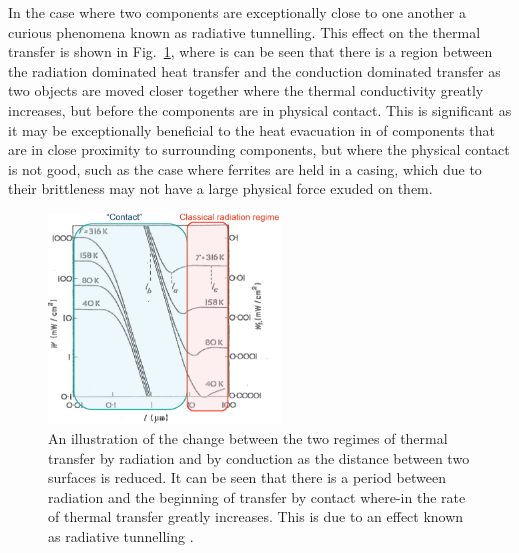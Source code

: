 In the case where two components are exceptionally close to one another a curious phenomena known as radiative tunnelling. This effect on the thermal transfer is shown in Fig.~\ref{fig:irTun}, where is can be seen that there is a region between the radiation dominated heat transfer and the conduction dominated transfer as two objects are moved closer together where the thermal conductivity greatly increases, but before the components are in physical contact. This is significant as it may be exceptionally beneficial to the heat evacuation in of components that are in close proximity to surrounding components, but where the physical contact is not good, such as the case where ferrites are held in a casing, which due to their brittleness may not have a large physical force exuded on them.

\begin{figure}
\begin{center}
\includegraphics[width=0.55\textwidth]{appendices/figures/irTunnelling.png}
\end{center}
\caption{An illustration of the change between the two regimes of thermal transfer by radiation and by conduction as the distance between two surfaces is reduced. It can be seen that there is a period between radiation and the beginning of transfer by contact where-in the rate of thermal transfer greatly increases. This is due to an effect known as radiative tunnelling \cite{Hargreaves:IRTunnel}.}
\label{fig:irTun}
\end{figure}
